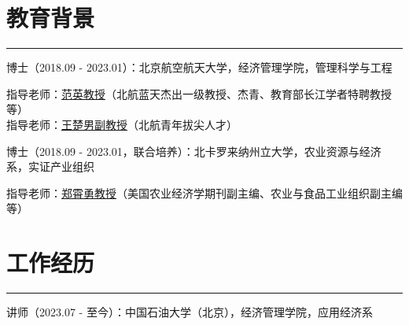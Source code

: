 \documentclass[letterpaper]{article}
\renewenvironment{itemize}{
  \begin{list}{}{
    \setlength{\leftmargin}{0.2in}
    \setlength{\itemsep}{0.1in}
    \setlength{\parskip}{0.025in}
    \setlength{\parsep}{0.025in}
  }
}{
  \end{list}
}
\begin{document}
\section*{教育背景}
\hrule
\vspace{0.25cm}
  \begin{itemize}
    \item 博士（2018.09 - 2023.01）：北京航空航天大学，经济管理学院，管理科学与工程
      \begin{itemize}
        \item 指导老师：\href{http://sem.buaa.edu.cn/szdw/yyjjx/fy/jbxx.htm}{范英教授}（北航蓝天杰出一级教授、杰青、教育部长江学者特聘教授等）\\
        指导老师：\href{https://shi.buaa.edu.cn/wangbuaa08/zh_CN/index.htm}{王楚男副教授}（北航青年拔尖人才）
      \end{itemize}
    \item 博士（2018.09 - 2023.01，联合培养）：北卡罗来纳州立大学，农业资源与经济系，实证产业组织
      \begin{itemize}
        \item 指导老师：\href{https://cals.ncsu.edu/agricultural-and-resource-economics/people/xiaoyong-zheng/}{郑霄勇教授}（美国农业经济学期刊副主编、农业与食品工业组织副主编等）
      \end{itemize}
  \end{itemize}

\section*{工作经历}
\hrule
\vspace{0.25cm}
  \begin{itemize}
    \item 讲师（2023.07 - 至今）：中国石油大学（北京），经济管理学院，应用经济系
  \end{itemize}
\end{document}
